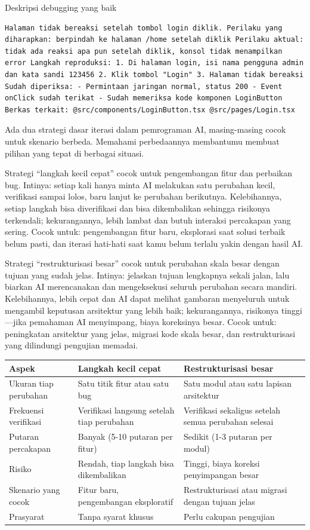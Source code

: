 Deskripsi debugging yang baik

\begin{lstlisting}
Halaman tidak bereaksi setelah tombol login diklik. Perilaku yang diharapkan: berpindah ke halaman /home setelah diklik Perilaku aktual: tidak ada reaksi apa pun setelah diklik, konsol tidak menampilkan error Langkah reproduksi: 1. Di halaman login, isi nama pengguna admin dan kata sandi 123456 2. Klik tombol "Login" 3. Halaman tidak bereaksi Sudah diperiksa: - Permintaan jaringan normal, status 200 - Event onClick sudah terikat - Sudah memeriksa kode komponen LoginButton Berkas terkait: @src/components/LoginButton.tsx @src/pages/Login.tsx
\end{lstlisting}


Ada dua strategi dasar iterasi dalam pemrograman AI, masing-masing cocok untuk skenario berbeda. Memahami perbedaannya membantumu membuat pilihan yang tepat di berbagai situasi.

Strategi “langkah kecil cepat” cocok untuk pengembangan fitur dan perbaikan bug. Intinya: setiap kali hanya minta AI melakukan satu perubahan kecil, verifikasi sampai lolos, baru lanjut ke perubahan berikutnya. Kelebihannya, setiap langkah bisa diverifikasi dan bisa dikembalikan sehingga risikonya terkendali; kekurangannya, lebih lambat dan butuh interaksi percakapan yang sering. Cocok untuk: pengembangan fitur baru, eksplorasi saat solusi terbaik belum pasti, dan iterasi hati-hati saat kamu belum terlalu yakin dengan hasil AI.

Strategi “restrukturisasi besar” cocok untuk perubahan skala besar dengan tujuan yang sudah jelas. Intinya: jelaskan tujuan lengkapnya sekali jalan, lalu biarkan AI merencanakan dan mengeksekusi seluruh perubahan secara mandiri. Kelebihannya, lebih cepat dan AI dapat melihat gambaran menyeluruh untuk mengambil keputusan arsitektur yang lebih baik; kekurangannya, risikonya tinggi—jika pemahaman AI menyimpang, biaya koreksinya besar. Cocok untuk: peningkatan arsitektur yang jelas, migrasi kode skala besar, dan restrukturisasi yang dilindungi pengujian memadai.

\begin{center}
\begin{tabularx}{\linewidth}{|X|X|X|}
\hline
\textbf{Aspek} & \textbf{Langkah kecil cepat} & \textbf{Restrukturisasi besar} \tabularnewline
\hline
Ukuran tiap perubahan & Satu titik fitur atau satu bug & Satu modul atau satu lapisan arsitektur \tabularnewline
Frekuensi verifikasi & Verifikasi langsung setelah tiap perubahan & Verifikasi sekaligus setelah semua perubahan selesai \tabularnewline
Putaran percakapan & Banyak (5-10 putaran per fitur) & Sedikit (1-3 putaran per modul) \tabularnewline
Risiko & Rendah, tiap langkah bisa dikembalikan & Tinggi, biaya koreksi penyimpangan besar \tabularnewline
Skenario yang cocok & Fitur baru, pengembangan eksploratif & Restrukturisasi atau migrasi dengan tujuan jelas \tabularnewline
Prasyarat & Tanpa syarat khusus & Perlu cakupan pengujian \tabularnewline
\hline
\end{tabularx}
\end{center}

